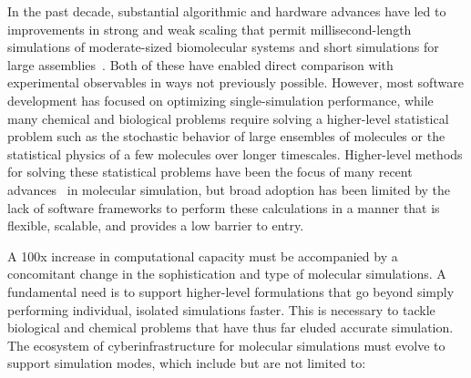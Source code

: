 \documentclass[10pt,letterpaper,draft]{article}
\begin{document}
{\noindent In} the past decade, substantial algorithmic and hardware advances have led to
improvements in strong and weak scaling that permit millisecond-length
simulations of moderate-sized biomolecular systems and short simulations for
large assemblies~\cite{kasson2}.  Both of these have enabled direct comparison with
experimental observables in ways not previously possible.  However, most
software development has focused on optimizing single-simulation performance,
while many chemical and biological problems require solving a higher-level
statistical problem such as the stochastic behavior of large ensembles of
molecules or the statistical physics of a few molecules over longer timescales.
Higher-level methods for solving these statistical problems have been the focus
of many recent advances~\cite{kasson1} in molecular simulation, but broad adoption has been
limited by the lack of software frameworks to perform these calculations in a
manner that is flexible, scalable, and provides a low barrier to entry.


A 100x increase in computational capacity must be accompanied by a concomitant
change in the sophistication and type of molecular simulations. A fundamental
need is to support higher-level formulations that go beyond simply performing
individual, isolated simulations faster.
This is necessary to tackle biological and chemical problems that have thus far
eluded accurate simulation.  The ecosystem of cyberinfrastructure for molecular
simulations must evolve to support simulation modes, which include but are not
limited to:
\end{document}
